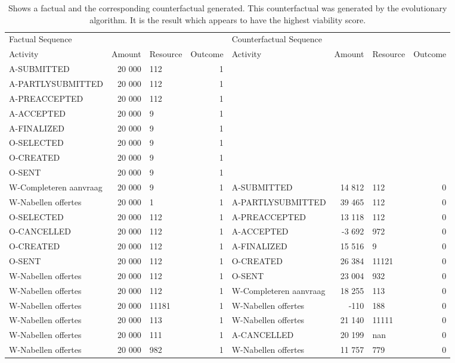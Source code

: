 \begin{table}
\caption{Shows a factual and the corresponding counterfactual generated. This counterfactual was generated by the evolutionary algorithm. It is the result which appears to have the highest viability score.}
\label{tbl:example-cf-evo}
\begin{tabular}{lrlrlrlr}
\toprule
\multicolumn{4}{l}{Factual Sequence} & \multicolumn{4}{l}{Counterfactual Sequence} \\
Activity & Amount & Resource & Outcome & Activity & Amount & Resource & Outcome \\
\midrule
A-SUBMITTED & 20 000 & 112 & 1 &  &  &  &  \\
A-PARTLYSUBMITTED & 20 000 & 112 & 1 &  &  &  &  \\
A-PREACCEPTED & 20 000 & 112 & 1 &  &  &  &  \\
A-ACCEPTED & 20 000 & 9 & 1 &  &  &  &  \\
A-FINALIZED & 20 000 & 9 & 1 &  &  &  &  \\
O-SELECTED & 20 000 & 9 & 1 &  &  &  &  \\
O-CREATED & 20 000 & 9 & 1 &  &  &  &  \\
O-SENT & 20 000 & 9 & 1 &  &  &  &  \\
W-Completeren aanvraag & 20 000 & 9 & 1 & A-SUBMITTED & 14 812 & 112 & 0 \\
W-Nabellen offertes & 20 000 & 1 & 1 & A-PARTLYSUBMITTED & 39 465 & 112 & 0 \\
O-SELECTED & 20 000 & 112 & 1 & A-PREACCEPTED & 13 118 & 112 & 0 \\
O-CANCELLED & 20 000 & 112 & 1 & A-ACCEPTED & -3 692 & 972 & 0 \\
O-CREATED & 20 000 & 112 & 1 & A-FINALIZED & 15 516 & 9 & 0 \\
O-SENT & 20 000 & 112 & 1 & O-CREATED & 26 384 & 11121 & 0 \\
W-Nabellen offertes & 20 000 & 112 & 1 & O-SENT & 23 004 & 932 & 0 \\
W-Nabellen offertes & 20 000 & 112 & 1 & W-Completeren aanvraag & 18 255 & 113 & 0 \\
W-Nabellen offertes & 20 000 & 11181 & 1 & W-Nabellen offertes & -110 & 188 & 0 \\
W-Nabellen offertes & 20 000 & 113 & 1 & W-Nabellen offertes & 21 140 & 11111 & 0 \\
W-Nabellen offertes & 20 000 & 111 & 1 & A-CANCELLED & 20 199 & nan & 0 \\
W-Nabellen offertes & 20 000 & 982 & 1 & W-Nabellen offertes & 11 757 & 779 & 0 \\

\end{tabular}
\end{table}
